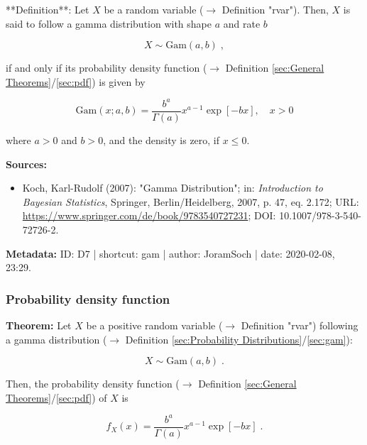 \documentclass[a4paper,12pt]{book}
\begin{document}
**Definition**: Let $X$ be a random variable ($\rightarrow$ Definition "rvar"). Then, $X$ is said to follow a gamma distribution with shape $a$ and rate $b$

\begin{equation} \label{eq:gam-gam}
X \sim \mathrm{Gam}(a, b) \; ,
\end{equation}

if and only if its probability density function ($\rightarrow$ Definition \ref{sec:General Theorems}/\ref{sec:pdf}) is given by

\begin{equation} \label{eq:gam-gam-pdf}
\mathrm{Gam}(x; a, b) = \frac{b^a}{\Gamma(a)} x^{a-1} \exp[-b x], \quad x > 0
\end{equation}

where $a > 0$ and $b > 0$, and the density is zero, if $x \leq 0$.

\vspace{1em}
\textbf{Sources:}
\begin{itemize}
\item Koch, Karl-Rudolf (2007): "Gamma Distribution"; in: \textit{Introduction to Bayesian Statistics}, Springer, Berlin/Heidelberg, 2007, p. 47, eq. 2.172; URL: \url{https://www.springer.com/de/book/9783540727231}; DOI: 10.1007/978-3-540-72726-2.
\end{itemize}


\vspace{1em}
\textbf{Metadata:} ID: D7 | shortcut: gam | author: JoramSoch | date: 2020-02-08, 23:29.


\subsubsection[\textbf{Probability density function}]{Probability density function} \label{sec:gam-pdf}

\vspace{1em}
\textbf{Theorem:} Let $X$ be a positive random variable ($\rightarrow$ Definition "rvar") following a gamma distribution ($\rightarrow$ Definition \ref{sec:Probability Distributions}/\ref{sec:gam}):

\begin{equation} \label{eq:gam-pdf-gam}
X \sim \mathrm{Gam}(a, b) \; .
\end{equation}

Then, the probability density function ($\rightarrow$ Definition \ref{sec:General Theorems}/\ref{sec:pdf}) of $X$ is

\begin{equation} \label{eq:gam-pdf-gam-pdf}
f_X(x) = \frac{b^a}{\Gamma(a)} x^{a-1} \exp[-b x] \; .
\end{equation}
\end{document}
